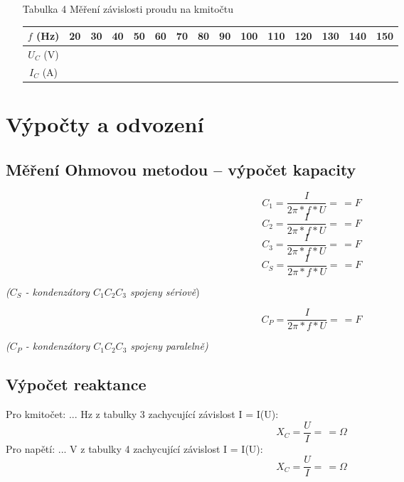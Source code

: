\documentclass[a4paper,12pt]{report}
\begin{document}
\begin{itemize}
\begin{center}
	\end{center}
 \item[Tabulka 4]{Měření závislosti proudu na kmitočtu}
	\begin{center}
		\begin{tabular}{|c|c|c|c|c|c|c|c|c|c|c|c|c|c|c|}
\hline
$f$ (Hz)  & 20 & 30 & 40 & 50 & 60 & 70 & 80 & 90 & 100 & 110 & 120 & 130 & 140 & 150 \\\hline
$U_C$ (V) &    &    &    &    &    &    &    &    &     &     &     &     &     &     \\\hline
$I_C$ (A) &    &    &    &    &    &    &    &    &     &     &     &     &     &     \\\hline
		\end{tabular}
	\end{center}
\end{itemize}
\newpage
\chapter*{Výpočty a odvození}
\section*{Měření Ohmovou metodou – výpočet kapacity}
$$C_1 = \frac{I}{2\pi*f*U} = \frac{}{} = F$$
$$C_2 = \frac{I}{2\pi*f*U} = \frac{}{} = F$$
$$C_3 = \frac{I}{2\pi*f*U} = \frac{}{} = F$$
$$C_S = \frac{I}{2\pi*f*U} = \frac{}{} = F$$
	\begin{center}\textit{($C_S$ - kondenzátory $C_1C_2C_3$ spojeny sériově})\end{center}
	$$C_P = \frac{I}{2\pi*f*U} = \frac{}{} = F$$
	\begin{center}\textit{($C_P$ - kondenzátory $C_1C_2C_3$ spojeny paralelně)}\end{center}
\section*{Výpočet reaktance}
Pro kmitočet: ... Hz z tabulky 3 zachycující závislost I = I(U):
$$X_C = \frac{U}{I} = \frac{}{} = \Omega$$
Pro napětí: ... V z tabulky 4 zachycující závislost I = I(U):
$$X_C = \frac{U}{I} = \frac{}{} = \Omega$$
\newpage
\end{document}
